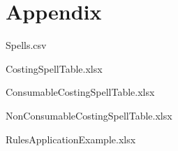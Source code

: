 \documentclass{article}
\begin{document}
    \newpage
    \section*{Appendix}

    Spells.csv

    CostingSpellTable.xlsx
    
    ConsumableCostingSpellTable.xlsx
    
    NonConsumableCostingSpellTable.xlsx

    RulesApplicationExample.xlsx
    
    
\end{document}
